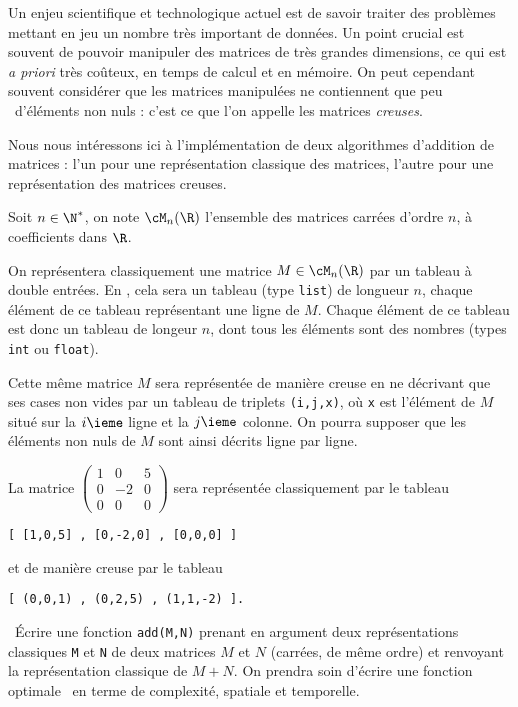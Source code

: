 Un enjeu scientifique et technologique actuel est de savoir traiter des problèmes mettant en jeu un nombre très important de données.
Un point crucial est souvent de pouvoir manipuler des matrices de très grandes dimensions, ce qui est \emph{a priori} très coûteux, en temps de calcul et en mémoire. 
On peut cependant souvent considérer que les matrices manipulées ne contiennent que \og peu \fg\ d'éléments non nuls : c'est ce que l'on appelle les matrices \emph{creuses}. 

Nous nous intéressons ici à l'implémentation de deux algorithmes d'addition de matrices : l'un pour une représentation classique des matrices, l'autre pour une représentation des matrices creuses.

Soit $n\in\N^\ast$, on note $\cM_n(\R)$ l'ensemble des matrices carrées d'ordre $n$, à coefficients dans $\R$.  

On représentera classiquement une matrice $M\in \cM_n(\R)$ par un tableau à double entrées. 
En \python, cela sera un tableau (type \texttt{list}) de longueur $n$, chaque élément de ce tableau représentant une ligne de $M$.
Chaque élément de ce tableau est donc un tableau de longeur $n$, dont tous les éléments sont des nombres (types \texttt{int} ou \texttt{float}).

Cette même matrice $M$ sera représentée de manière creuse en ne décrivant que ses cases non vides par un tableau de triplets \texttt{(i,j,x)}, où \texttt{x} est l'élément de $M$ situé sur la $i\ieme$ ligne et la $j\ieme$ colonne. 
On pourra supposer que les éléments non nuls de $M$ sont ainsi décrits ligne par ligne. 

\begin{ex}
  La matrice $\begin{pmatrix} 1&0&5 \\ 0&-2&0 \\ 0&0&0 \end{pmatrix}$ sera représentée classiquement par le tableau 
\begin{verbatim}
[ [1,0,5] , [0,-2,0] , [0,0,0] ]
\end{verbatim}
et de manière creuse par le tableau 
\begin{verbatim}
[ (0,0,1) , (0,2,5) , (1,1,-2) ].
\end{verbatim}
\end{ex}

\question\ \'Ecrire une fonction \texttt{add(M,N)} prenant en argument deux représentations classiques \texttt{M} et \texttt{N} de deux matrices $M$ et $N$ (carrées, de même ordre) et renvoyant la représentation classique de $M+N$. 
On prendra soin d'écrire une fonction \og optimale \fg\ en terme de complexité, spatiale et temporelle. 

